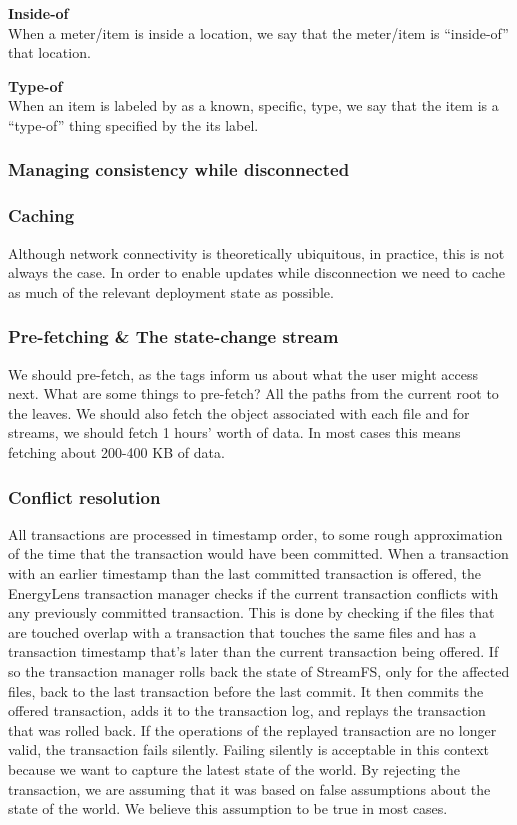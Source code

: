 {\bf Inside-of}\\
When a meter/item is inside a location, we say that the meter/item is “inside-of” that location.

{\bf Type-of}\\
When an item is labeled by as a known, specific, type, we say that the item is a “type-of” thing specified by the its label.

\subsubsection{Managing consistency while disconnected}

\subsubsection{Caching}
Although network connectivity is theoretically ubiquitous, in practice, this is not always the case.  In order to enable updates while disconnection we need to cache as much of the relevant deployment state as possible.

\subsubsection{Pre-fetching \& The state-change stream}
We should pre-fetch, as the tags inform us about what the user might access next.  What are some things to pre-fetch?  All the paths from the current root to the leaves.  We should also fetch the object associated with each file and for streams, we should fetch 1 hours’ worth of data.  In most cases this means fetching about 200-400 KB of data.

\subsubsection{Conflict resolution}
All transactions are processed in timestamp order, to some rough approximation of the time that the transaction would have been committed.  When a transaction with an earlier timestamp than the last committed transaction is offered, the EnergyLens transaction manager checks if the current transaction conflicts with any previously committed transaction.  This is done by checking if the files that are touched overlap with a transaction that touches the same files and has a transaction timestamp that’s later than the current transaction being offered.  If so the transaction manager rolls back the state of StreamFS, only for the affected files, back to the last transaction before the last commit.  It then commits the offered transaction, adds it to the transaction log, and replays the transaction that was rolled back.  If the operations of the replayed transaction are no longer valid, the transaction fails silently.  Failing silently is acceptable in this context because we want to capture the latest state of the world.  By rejecting the transaction, we are assuming that it was based on false assumptions about the state of the world.  We believe this assumption to be true in most cases.